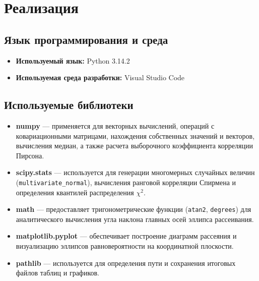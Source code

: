\documentclass[a4paper, 14pt]{extarticle}
\begin{document}
\section{Реализация}

\subsection{Язык программирования и среда}
\begin{itemize}
    \item \textbf{Используемый язык:} Python 3.14.2
    \item \textbf{Используемая среда разработки:} Visual Studio Code
\end{itemize}

\subsection{Используемые библиотеки}
\begin{itemize}
    \item \textbf{numpy} --- применяется для векторных вычислений, операций с ковариационными матрицами, нахождения собственных значений и векторов, вычисления медиан, а также расчета выборочного коэффициента корреляции Пирсона.
    \item \textbf{scipy.stats} --- используется для генерации многомерных случайных величин (\texttt{multivariate\_normal}), вычисления ранговой корреляции Спирмена и определения квантилей распределения $\chi^2$.
    \item \textbf{math} --- предоставляет тригонометрические функции (\texttt{atan2}, \texttt{degrees}) для аналитического вычисления угла наклона главных осей эллипса рассеивания.
    \item \textbf{matplotlib.pyplot} --- обеспечивает построение диаграмм рассеяния и визуализацию эллипсов равновероятности на координатной плоскости.
    \item \textbf{pathlib} --- используется для определения пути и сохранения итоговых файлов таблиц и графиков.
\end{itemize}
\end{document}
